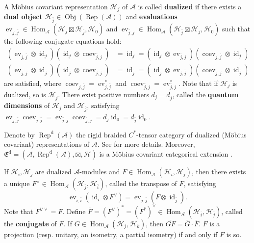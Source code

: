 \documentclass{article}
\newcommand{\hilb}{\mathcal{H}}
\newcommand{\A}{\mathcal{A}}
\begin{document}
A M\"{o}bius covariant representation $\hilb_j$ of $\A$ is called \textbf{dualized} if there exists a \textbf{dual object} $\hilb_{\overline{j}} \in \operatorname{Obj}(\operatorname{Rep}(\A))$ and \textbf{evaluations}
$\operatorname{ev}_{j,\overline{j}} \in \operatorname{Hom}_\A(\hilb_j\boxtimes\hilb_{\overline{j}}, \hilb_0)$ and 
$\operatorname{ev}_{\overline{j},j} \in \operatorname{Hom}_\A(\hilb_{\overline{j}}\boxtimes\hilb_j, \hilb_0)$ such that the following conjugate equations hold:
\begin{align*}
    (\operatorname{ev}_{j,\overline{j}}\otimes \operatorname{id}_j)(\operatorname{id}_j \otimes \operatorname{coev}_{\overline{j}, j})  & = \operatorname{id}_j = (\operatorname{id}_j\otimes\operatorname{ev}_{\overline{j},j})(\operatorname{coev}_{j,\overline{j}}\otimes \operatorname{id}_j)  \\
      (\operatorname{ev}_{\overline{j},j}\otimes \operatorname{id}_{\overline{j}})(\operatorname{id}_{\overline{j}} \otimes \operatorname{coev}_{j,\overline{j}})  & = \operatorname{id}_{\overline{j}} = (\operatorname{id}_{\overline{j}}\otimes\operatorname{ev}_{j,\overline{j}})(\operatorname{coev}_{\overline{j},j}\otimes \operatorname{id}_{\overline{j}})
\end{align*}
are satisfied, where
$\operatorname{coev}_{j,\overline{j}} = \operatorname{ev}_{j,\overline{j}}^*$ and 
$\operatorname{coev}_{\overline{j},j} = \operatorname{ev}_{\overline{j},j}^*$. Note that 
if $\hilb_j$ is dualized,  so is $\hilb_{\overline{j}}$. 
There exist positive numbers 
$d_j= d_{\overline{j}}$, called the \textbf{quantum dimensions} of $\hilb_j $ and $\hilb_{\overline{j}}$,
satisfying 
$\operatorname{ev}_{j,\overline{j}}\operatorname{coev}_{j,\overline{j}} = \operatorname{ev}_{\overline{j},j}\operatorname{coev}_{\overline{j},j} = d_j \operatorname{id}_0 = d_{\overline{j}}\operatorname{id}_0 $.

Denote by $\operatorname{Rep}^{\operatorname{d}}(\A)$
the rigid braided $C^*$-tensor category of 
dualized (M\"{o}bius covariant) representations of $\A$. 
See \cite[Section 3]{gui2021bisognano} for more details. 
Moreover, 
$\mathfrak{E}^{\operatorname{d}}  = \left(\A, \operatorname{Rep}^{\operatorname{d}}(\A), \boxtimes , \hilb  \right)$ is a M\"{o}bius covariant categorical extension \cite[Theorem 3.8]{gui2021bisognano}. 

If $\hilb_i, \hilb_j$ are dualized $\A$-modules and 
$F\in \operatorname{Hom}_\A(\hilb_i, \hilb_j)$, 
then there exists a unique $F^{\vee} \in \operatorname{Hom}_\A(\hilb_{\overline{j}}, \hilb_{\overline{i}})$, called the transpose of $F$, satisfying 
\[
\operatorname{ev}_{i,\overline{i}} (\operatorname{id}_i \otimes F^{\vee}) = \operatorname{ev}_{j,\overline{j}}(F \otimes \operatorname{id}_{\overline{j}}).  
\]
Note that  $F^{\vee\vee} = F$. 
Define $\overline{F} = (F^\vee)^* = (F^*)^\vee \in
\operatorname{Hom}_\A(\hilb_{\overline{i}}, \hilb_{\overline{j}})$, called the \textbf{conjugate} 
of $F$. If $G \in \operatorname{Hom}_\A(\hilb_j, \hilb_k)$,
then 
$\overline{GF} = \overline{G} \cdot \overline{F}$.
$F $ is a projection (resp. unitary, an isometry, a
partial isometry) if and only if $F$ is so.
\end{document}
